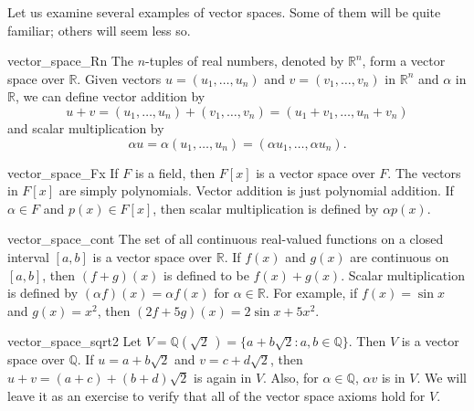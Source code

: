 Let us examine several examples of vector spaces. Some of them will be
quite familiar; others will seem less so.
 
 
\begin{example}{vector_space_Rn}
The $n$-tuples of real numbers, denoted by ${\mathbb R}^n$, form a vector
space over ${\mathbb R}$. Given vectors $u = (u_1, \ldots, u_n)$ and $v =
(v_1, \ldots, v_n)$ in ${\mathbb R}^n$ and $\alpha$ in ${\mathbb R}$, we can
define vector addition by
\[
u + v = (u_1, \ldots, u_n) + (v_1, \ldots, v_n)
=
(u_1 + v_1, \ldots, u_n + v_n)
\]
and scalar multiplication by 
\[
\alpha u = \alpha(u_1, \ldots, u_n)= (\alpha u_1, \ldots, \alpha u_n).
\]
\end{example}
 
 
 
\begin{example}{vector_space_Fx}
If $F$ is a field, then $F[x]$ is a vector space over $F$. The vectors
in $F[x]$ are simply polynomials.  Vector addition is just polynomial
addition. If $\alpha \in F$ and $p(x) \in F[x]$, then scalar
multiplication is defined by $\alpha p(x)$.
\end{example}
 
 
\begin{example}{vector_space_cont}
The set of all continuous real-valued functions on a closed interval
$[a,b]$ is a vector space over ${\mathbb R}$.  If $f(x)$ and $g(x)$ are
continuous on $[a, b]$, then $(f+g)(x)$ is defined to be $f(x) +
g(x)$.  Scalar multiplication is defined by
$(\alpha f)(x) = \alpha f(x)$ for $\alpha \in 
{\mathbb R}$. For example, if $f(x) = \sin x$ and $g(x)= x^2$, then 
$(2f+5g)(x) =2 \sin x + 5 x^2$. 
\end{example}
 

 
\begin{example}{vector_space_sqrt2}
Let $V = {\mathbb Q}(\sqrt{2}\, ) = \{ a + b \sqrt{2} : a, b \in 
{\mathbb Q } \}$. Then $V$ is a
vector space over ${\mathbb Q}$. If $u = a + b \sqrt{2}$ and $v = c + d
\sqrt{2}$, then $u + v = (a + c) + (b + d ) \sqrt{2}$ is again in $V$.
Also, for $\alpha \in {\mathbb Q}$, $\alpha v$ is in $V$.  We will leave
it as an exercise to verify that all of the vector space axioms hold
for $V$. 
\end{example}

